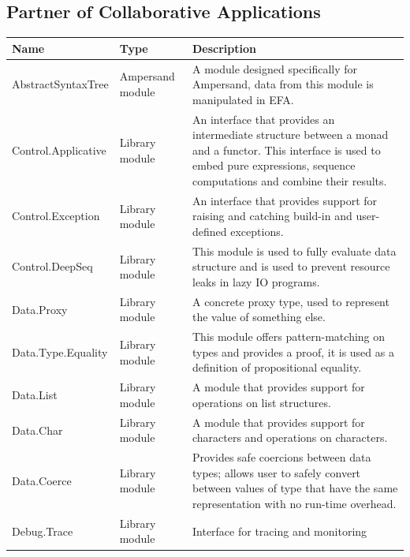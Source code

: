 \documentclass[12pt]{report}
\begin{document}

\subsection{Partner of Collaborative Applications}
\begin{longtable}{ |m{4.5cm}|m{1.5cm}|m{7cm}|  }
    \hline 
    \textbf{Name} & \textbf{Type} & \textbf{Description} \\ \hline \hline
    AbstractSyntaxTree & Ampersand module & A module designed specifically for 
    Ampersand, data from this module is manipulated in EFA.
    \\ \hline        
    Control.Applicative & Library module & An interface that provides an 
    intermediate structure between a monad and a functor. This interface is 
    used to embed pure expressions, sequence computations and combine their 
    results.  \\ \hline
    Control.Exception & Library module & An interface that provides support for 
    raising and catching build-in and user-defined exceptions.  \\ \hline
    Control.DeepSeq & Library module & This module is used to fully evaluate 
    data structure and is used to prevent resource leaks in lazy IO programs.  
    \\ \hline            
    Data.Proxy & Library module & A concrete proxy type, used to represent the 
    value of something else.  \\ \hline    
    Data.Type.Equality & Library module & This module offers pattern-matching 
    on types and provides a proof, it is used as a definition of propositional 
    equality.  \\ \hline        
    Data.List & Library module & A module that provides support for operations 
    on list structures.  \\ \hline
    Data.Char & Library module & A module that provides support for characters 
    and operations on characters.  \\ \hline
    Data.Coerce & Library module & Provides safe coercions between data types; 
    allows user to safely convert between values of type that have the same 
    representation with no run-time overhead.   \\ \hline
    Debug.Trace & Library module & Interface for tracing and monitoring 

\end{longtable}
\end{document}
